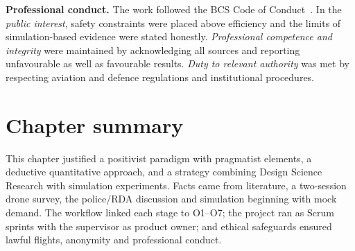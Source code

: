 \textbf{Professional conduct.} The work followed the BCS Code of Conduct~\cite{bcs_codeofconduct}. In the \emph{public interest}, safety constraints were placed above efficiency and the limits of simulation-based evidence were stated honestly. \emph{Professional competence and integrity} were maintained by acknowledging all sources and reporting unfavourable as well as favourable results. \emph{Duty to relevant authority} was met by respecting aviation and defence regulations and institutional procedures.

\section{Chapter summary}\label{sec:method-summary}

This chapter justified a positivist paradigm with pragmatist elements, a deductive quantitative approach, and a strategy combining Design Science Research with simulation experiments. Facts came from literature, a two-session drone survey, the police/RDA discussion and simulation beginning with mock demand. The workflow linked each stage to O1--O7; the project ran as Scrum sprints with the supervisor as product owner; and ethical safeguards ensured lawful flights, anonymity and professional conduct.
